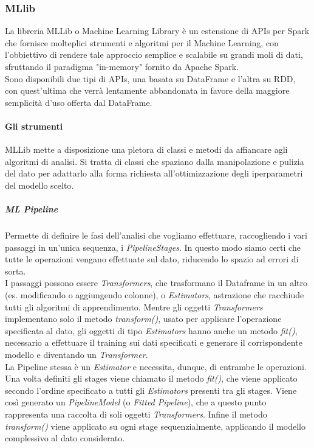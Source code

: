 \subsubsection{MLlib}
La libreria MLLib \cite{spark_mllib_doc} o Machine Learning Library è un estensione di APIs per Spark che fornisce molteplici strumenti e algoritmi per il Machine Learning, con l'obbiettivo di rendere tale approccio semplice e scalabile su grandi moli di dati, sfruttando il paradigma "in-memory" fornito da Apache Spark.\\
Sono disponibili due tipi di APIs, una basata su DataFrame e l'altra su RDD, con quest'ultima che verrà lentamente abbandonata in favore della maggiore semplicità d'uso offerta dal DataFrame.

\paragraph{Gli strumenti} 
MLLib mette a disposizione una pletora di classi e metodi da affiancare agli algoritmi di analisi. Si tratta di classi che spaziano dalla manipolazione e pulizia del dato per adattarlo alla forma richiesta all'ottimizzazione degli iperparametri del modello scelto.

\subparagraph{ML Pipeline} 
Permette di definire le fasi dell'analisi che vogliamo effettuare, raccogliendo i vari passaggi in un'unica sequenza, i \textit{PipelineStages}. In questo modo siamo certi che tutte le operazioni vengano effettuate sul dato, riducendo lo spazio ad errori di sorta.\\
I passaggi possono essere \textit{Transformers}, che trasformano il Dataframe in un altro (es. modificando o aggiungendo colonne), o \textit{Estimators}, astrazione che racchiude tutti gli algoritmi di apprendimento. Mentre gli oggetti \textit{Transformers} implementano solo il metodo \textit{transform()}, usato per applicare l'operazione specificata al dato, gli oggetti di tipo \textit{Estimators} hanno anche un metodo \textit{fit()}, necessario a effettuare il training sui dati specificati e generare il corrispondente modello e diventando un \textit{Transformer}.\\ 
La Pipeline stessa è un \textit{Estimator} e necessita, dunque, di entrambe le operazioni. Una volta definiti gli stages viene chiamato il metodo \textit{fit()}, che viene applicato secondo l'ordine specificato a tutti gli \textit{Estimators} presenti tra gli stages. Viene così generato un \textit{PipelineModel} (o \textit{Fitted Pipeline}), che a questo punto rappresenta una raccolta di soli oggetti \textit{Transformers}. Infine il metodo \textit{transform()} viene applicato su ogni stage sequenzialmente, applicando il modello complessivo al dato considerato.

